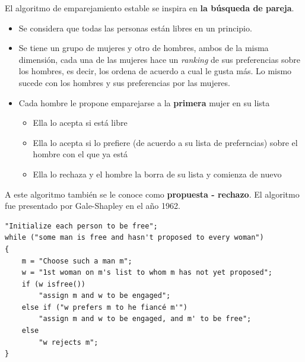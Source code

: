 \documentclass[letterpaper, 12pt]{article}
\begin{document}
El algoritmo de emparejamiento estable se inspira en \textbf{la búsqueda de pareja}.
\begin{itemize}
\item Se considera que todas las personas están libres en un principio.
\item Se tiene un grupo de mujeres y otro de hombres, ambos de la misma dimensión,
cada una de las mujeres hace un \emph{ranking} de sus preferencias sobre los
hombres, es decir, los ordena de acuerdo a cual le gusta más. Lo mismo sucede
con los hombres y sus preferencias por las mujeres.
\item Cada hombre le propone emparejarse a la \textbf{primera} mujer en su lista
\begin{itemize}
\item Ella lo acepta si está libre
\item Ella lo acepta si lo prefiere (de acuerdo a su lista de preferncias) sobre
el hombre con el que ya está
\item Ella lo rechaza y el hombre la borra de su lista y comienza de nuevo
\end{itemize}
\end{itemize}
A este algoritmo también se le conoce como \textbf{propuesta - rechazo}. El algoritmo
fue presentado por Gale-Shapley en el año 1962.
\begin{verbatim}
"Initialize each person to be free";
while ("some man is free and hasn't proposed to every woman")
{
    m = "Choose such a man m";
    w = "1st woman on m's list to whom m has not yet proposed";
    if (w isfree())
        "assign m and w to be engaged";
    else if ("w prefers m to he fiancé m'")
        "assign m and w to be engaged, and m' to be free";
    else
        "w rejects m";
}
\end{verbatim}
\end{document}
